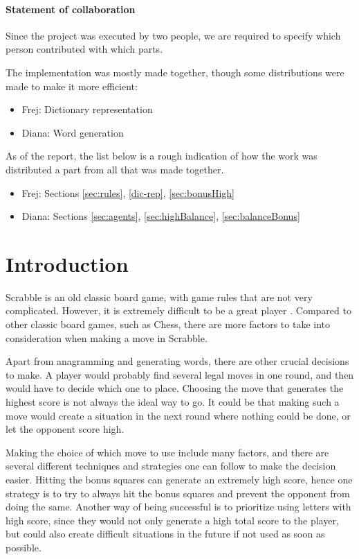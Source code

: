 \documentclass[a4paper, 12pt]{report}
\begin{document}
\subsubsection{Statement of collaboration}
Since the project was executed by two people, we are required to specify which person contributed with  which parts. 

The implementation was mostly made together, though some distributions were made to make it more efficient:
\begin{itemize}
\item{Frej}: Dictionary representation
\item{Diana}: Word generation
\end{itemize}

As of the report, the list below is a rough indication of how the work was distributed a part from all that was made together.

\begin{itemize}
\item{Frej}: Sections \ref{sec:rules}, \ref{dic-rep}, \ref{sec:bonusHigh}
\item{Diana}: Sections \ref{sec:agents}, \ref{sec:highBalance}, \ref{sec:balanceBonus}
\end{itemize}

\tableofcontents





\chapter{Introduction}
Scrabble is an old classic board game, with game rules that are not very complicated. However, it is extremely difficult to be a great player \cite{perfectgame}. Compared to other classic board games, such as Chess, there are more factors to take into consideration when making a move in Scrabble. 

Apart from anagramming and generating words, there are other crucial decisions to make. A player would probably find several legal moves in one round, and then would have to decide which one to place. Choosing the move that generates the highest score is not always the ideal way to go. It could be that making such a move would create a situation in the next round where nothing could be done, or let the opponent score high.

Making the choice of which move to use include many factors, and there are several different techniques and strategies one can follow to make the decision easier. Hitting the bonus squares can generate an extremely high score, hence one strategy is to try to always hit the bonus squares and prevent the opponent from doing the same. Another way of being successful is to prioritize using letters with high score, since they would not only generate a high total score to the player, but could also create difficult situations in the future if not used as soon as possible.
\end{document}
